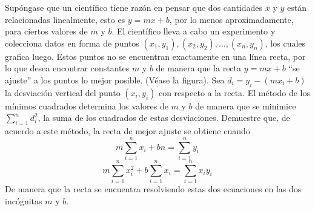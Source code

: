 \item Supóngase que un científico tiene razón en pensar que dos cantidades $x$ y $y$ están relacionadas linealmente, esto es $y = mx + b$, por lo menos aproximadamente, para ciertos valores de $m$ y $b$. El científico lleva a cabo un experimento y colecciona datos en forma de puntos $(x_1, y_1), (x_2, y_2), \dots, (x_n, y_n)$, los cuales grafica luego. Estos puntos no se encuentran exactamente en una línea recta, por lo que desea encontrar constantes $m$ y $b$ de manera que la recta $y = mx + b$ ``se ajuste'' a los puntos lo mejor posible. (Véase la figura). Sea $d_i = y_i - (mx_i + b)$ la desviación vertical del punto $(x_i, y_i)$ con respecto a la recta. El método de los mínimos cuadrados determina los valores de $m$ y $b$ de manera que se minimice $\sum_{i=1}^n d_i^2$, la suma de los cuadrados de estas desviaciones. Demuestre que, de acuerdo a este método, la recta de mejor ajuste se obtiene cuando
\[ m \sum_{i=1}^n x_i + bn = \sum_{i=1}^n y_i \]
\[ m \sum_{i=1}^n x_i^2 + b \sum_{i=1}^n x_i = \sum_{i=1}^n x_i y_i \]
De manera que la recta se encuentra resolviendo estas dos ecuaciones en las dos incógnitas $m$ y $b$.
